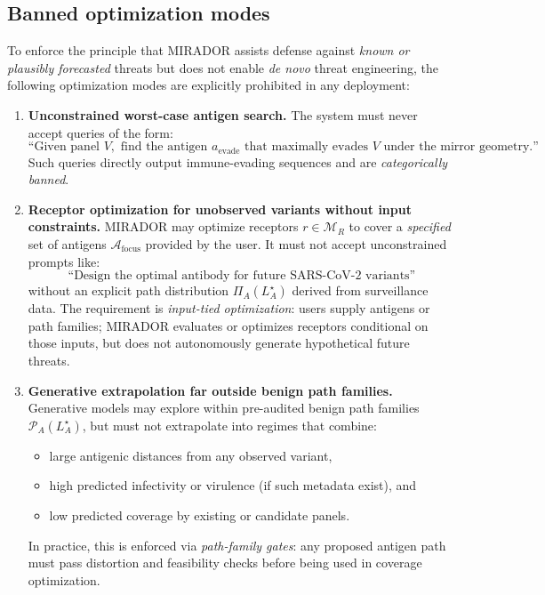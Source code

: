 \documentclass[11pt]{article}
\begin{document}
\subsection{Banned optimization modes}
\label{subsec:banned-modes}

To enforce the principle that MIRADOR assists defense against \emph{known or plausibly
forecasted} threats but does not enable \emph{de novo} threat engineering, the following
optimization modes are explicitly prohibited in any deployment:

\begin{enumerate}
  \item \textbf{Unconstrained worst-case antigen search.}
  The system must never accept queries of the form:
  \[
    \text{``Given panel } V, \text{ find the antigen } a_{\mathrm{evade}}
    \text{ that maximally evades } V \text{ under the mirror geometry.''}
  \]
  Such queries directly output immune-evading sequences and are \emph{categorically banned}.

  \item \textbf{Receptor optimization for unobserved variants without input constraints.}
  MIRADOR may optimize receptors $r \in \mathcal{M}_R$ to cover a \emph{specified} set of
  antigens $\mathcal{A}_{\mathrm{focus}}$ provided by the user. It must not accept
  unconstrained prompts like:
  \[
    \text{``Design the optimal antibody for future SARS-CoV-2 variants''}
  \]
  without an explicit path distribution $\Pi_A(L_A^\star)$ derived from surveillance data.
  The requirement is \emph{input-tied optimization}: users supply antigens or path families;
  MIRADOR evaluates or optimizes receptors conditional on those inputs, but does not
  autonomously generate hypothetical future threats.

  \item \textbf{Generative extrapolation far outside benign path families.}
  Generative models may explore within pre-audited benign path families
  $\mathcal{P}_A(L_A^\star)$, but must not extrapolate into regimes that combine:
  \begin{itemize}
    \item large antigenic distances from any observed variant,
    \item high predicted infectivity or virulence (if such metadata exist), and
    \item low predicted coverage by existing or candidate panels.
  \end{itemize}
  In practice, this is enforced via \emph{path-family gates}: any proposed antigen path must
  pass distortion and feasibility checks before being used in coverage optimization.


\end{enumerate}
\end{document}
